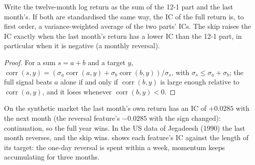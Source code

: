 \begin{proposition}\label{prop:rs:price-and-volume-features:skip}
Write the twelve-month log return as the sum of the 12-1 part and the last month's. If both are standardised the same way, the
IC of the full return is, to first order, a variance-weighted average of the two parts' ICs. The skip raises the IC exactly when the
last month's return has a lower IC than the 12-1 part, in particular when it is negative (a monthly reversal).
\end{proposition}

\begin{proof}
For a sum $s = a + b$ and a target $y$, $\operatorname{corr}(s, y) = (\sigma_a\operatorname{corr}(a, y) + \sigma_b\operatorname{corr}(b,
y))/\sigma_s$, with $\sigma_s \le \sigma_a + \sigma_b$; the full signal beats $a$ alone if and only if $\operatorname{corr}(b, y)$ is large
enough relative to $\operatorname{corr}(a, y)$, and it loses whenever $\operatorname{corr}(b, y) < 0$.
\end{proof}

On the synthetic market the last month's own return has an IC of $+0.0285$ with the next month (the reversal feature's $-0.0285$ with
the sign changed): continuation, so the full year wins. In the US data of Jegadeesh (1990) the last month reverses, and the skip wins.
 shows each feature's IC against the length of its target: the one-day reversal is
spent within a week, momentum keeps accumulating for three months.

